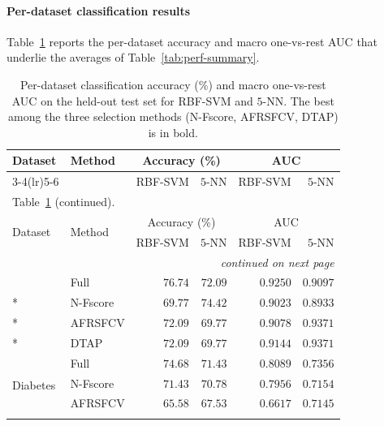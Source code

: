 \documentclass[]{interact}
\theoremstyle{plain}
\theoremstyle{definition}
\theoremstyle{remark}
\begin{document}
\paragraph*{Per-dataset classification results}
Table~\ref{tab:acc} reports the per-dataset accuracy and macro one-vs-rest AUC that underlie the averages of Table~\ref{tab:perf-summary}.


{\small
\begin{longtable}{ll rr rr}
\caption{Per-dataset classification accuracy (\%) and macro one-vs-rest AUC on the
held-out test set for RBF-SVM and $5$-NN. The best among the three selection methods
(N-Fscore, AFRSFCV, DTAP) is in bold.}\label{tab:acc} \\
\toprule
\multirow{2}{*}{Dataset} & \multirow{2}{*}{Method} & \multicolumn{2}{c}{Accuracy (\%)} & \multicolumn{2}{c}{AUC} \\
\cmidrule(lr){3-4}\cmidrule(lr){5-6}
 & & RBF-SVM & $5$-NN & RBF-SVM & $5$-NN \\
\midrule
\endfirsthead
\multicolumn{6}{l}{\footnotesize Table~\ref{tab:acc} (continued).} \\
\toprule
\multirow{2}{*}{Dataset} & \multirow{2}{*}{Method} & \multicolumn{2}{c}{Accuracy (\%)} & \multicolumn{2}{c}{AUC} \\
\cmidrule(lr){3-4}\cmidrule(lr){5-6}
 & & RBF-SVM & $5$-NN & RBF-SVM & $5$-NN \\
\midrule
\endhead
\midrule
\multicolumn{6}{r}{\footnotesize\emph{continued on next page}} \\
\endfoot
\bottomrule
\endlastfoot
\multirow{4}{*}{Glass}        & Full     & $76.74$          & $72.09$          & $0.9250$          & $0.9097$          \\*
                              & N-Fscore & $69.77$          & $\mathbf{74.42}$ & $0.9023$          & $0.8933$          \\*
                              & AFRSFCV  & $\mathbf{72.09}$ & $69.77$          & $0.9078$          & $\mathbf{0.9371}$ \\*
                              & DTAP     & $\mathbf{72.09}$ & $69.77$          & $\mathbf{0.9144}$ & $\mathbf{0.9371}$ \\
\midrule
\multirow{4}{*}{Diabetes}     & Full     & $74.68$          & $71.43$          & $0.8089$          & $0.7356$          \\*
                              & N-Fscore & $71.43$          & $70.78$          & $0.7956$          & $0.7154$          \\*
                              & AFRSFCV  & $65.58$          & $67.53$          & $0.6617$          & $0.7145$          \\*

\end{longtable}}
\end{document}
